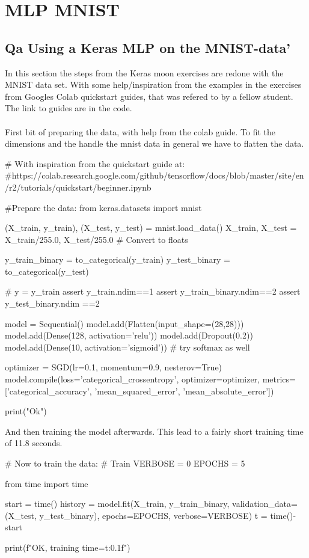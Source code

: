 \documentclass{article}
\begin{document}
\section{MLP MNIST}

\subsection{Qa Using a Keras MLP on the MNIST-data'}
In this section the steps from the Keras moon exercises are redone with the MNIST data set. With some help/inspiration from the examples in the exercises from Googles Colab quickstart guides, that was refered to by a fellow student. The link to guides are in the code.
\\ \\
First bit of preparing the data, with help from the colab guide. 
To fit the dimensions and the handle the mnist data in general we have to flatten the data.

\begin{pyminted}
# With inspiration from the quickstart guide at: 
#https://colab.research.google.com/github/tensorflow/docs/blob/master/site/en/r2/tutorials/quickstart/beginner.ipynb

#Prepare the data:
from keras.datasets import mnist

(X_train, y_train), (X_test, y_test) = mnist.load_data()
X_train, X_test = X_train/255.0, X_test/255.0 # Convert to floats

y_train_binary = to_categorical(y_train)
y_test_binary = to_categorical(y_test)

# y = y_train
assert y_train.ndim==1
assert y_train_binary.ndim==2
assert y_test_binary.ndim ==2


model = Sequential()
model.add(Flatten(input_shape=(28,28)))
model.add(Dense(128, activation='relu'))
model.add(Dropout(0.2))
model.add(Dense(10, activation='sigmoid')) # try softmax as well

optimizer = SGD(lr=0.1, momentum=0.9, nesterov=True)
model.compile(loss='categorical_crossentropy', 
              optimizer=optimizer, 
              metrics=['categorical_accuracy', 'mean_squared_error', 'mean_absolute_error'])

print("Ok")

\end{pyminted}

\noindent
 And then training the model afterwards. This lead to a fairly short training time of 11.8 seconds.
 
\begin{pyminted}
# Now to train the data:
# Train
VERBOSE     = 0
EPOCHS      = 5

from time import time

start = time()
history = model.fit(X_train, y_train_binary, validation_data=(X_test, y_test_binary), epochs=EPOCHS, verbose=VERBOSE)
t = time()-start

print(f"OK, training time={t:0.1f}")
\end{pyminted}
\end{document}
